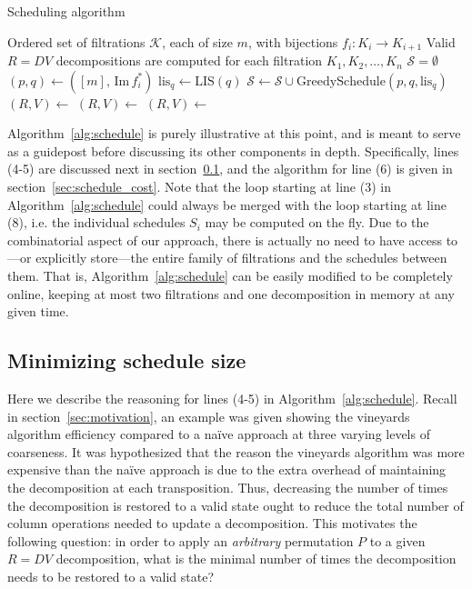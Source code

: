 \documentclass{siamart190516}
\begin{document}
\begin{algorithm}[h]
	\caption{Scheduling algorithm}\label{alg:schedule}
    \begin{algorithmic}[1]
    	\Require Ordered set of filtrations $\mathcal{K}$, each of size $m$, with bijections $f_{i}: K_i \to K_{i+1}$
    	\Ensure Valid $R = D V$ decompositions are computed for each filtration $K_1, K_2, \dots, K_n$
    		\State $\mathcal{S} = \emptyset$
    		    \State $(p, q) \gets ([m], \, \mathrm{Im}\, f^\ast_{i})$ 
    			\State $\mathrm{lis}_q \gets \mathrm{LIS}(q)$ 
    			\State $\mathcal{S} \gets \mathcal{S} \cup \mathrm{GreedySchedule}(p, q, \mathrm{lis}_q)$ 
    		\EndFor
	    	\State $(R, V) \gets$ 
	    			\State $(R, V) \gets$ 
	    		\Else
	    			\State $(R, V) \gets$ 
	    		\EndIf
	    	\EndFor
    	\EndProcedure
	\end{algorithmic}
\end{algorithm}
\noindent Algorithm~\ref{alg:schedule} is purely illustrative at this point, 
and is meant to serve as a guidepost before discussing its other components in depth. 
Specifically, lines (4-5) are discussed next in section~\ref{sec:schedule_sizes}, and the algorithm for line (6) is given in section~\ref{sec:schedule_cost}. 
Note that the loop starting at line (3) in Algorithm~\ref{alg:schedule} could always be merged with the loop starting at line (8), i.e. the individual schedules $S_i$ may be computed on the fly. Due to the combinatorial aspect of our approach, there is actually no need to have access to---or explicitly store---the entire family of filtrations and the schedules between them. That is, Algorithm~\ref{alg:schedule} can be easily modified to be completely online, keeping at most two filtrations and one decomposition in memory at any given time. 

\subsection{Minimizing schedule size}\label{sec:schedule_sizes}
Here we describe the reasoning for lines (4-5) in Algorithm~\ref{alg:schedule}. Recall in section~\ref{sec:motivation}, an example was given showing the vineyards algorithm efficiency compared to a naïve approach at three varying levels of coarseness. It was hypothesized that the reason the vineyards algorithm was more expensive than the naïve approach is due to the extra overhead of maintaining the decomposition at each transposition. Thus, decreasing the number of times the decomposition is restored to a valid state ought to reduce the total number of column operations needed to update a decomposition. This motivates the following question: 
in order to apply an \emph{arbitrary} permutation $P$ to a given $R = DV$ decomposition, 
what is the minimal number of times the decomposition needs to be restored to a valid state?
\end{document}
